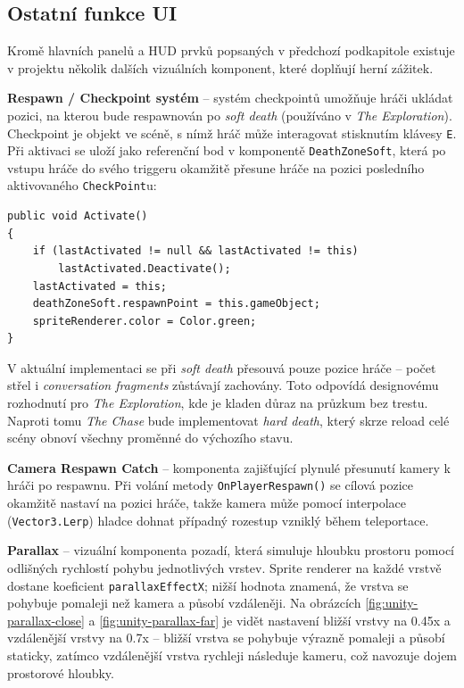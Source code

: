 \subsection{Ostatní funkce UI}
\label{sec:ostatni-funkce-ui}

Kromě hlavních panelů a HUD prvků popsaných v předchozí podkapitole existuje v projektu několik dalších vizuálních komponent, které doplňují herní zážitek.

\textbf{Respawn / Checkpoint systém} -- systém checkpointů umožňuje hráči ukládat pozici, na kterou bude respawnován po \emph{soft death} (používáno v \emph{The Exploration}). Checkpoint je objekt ve scéně, s nímž hráč může interagovat stisknutím klávesy \texttt{E}. Při aktivaci se uloží jako referenční bod v komponentě \texttt{DeathZoneSoft}, která po vstupu hráče do svého triggeru okamžitě přesune hráče na pozici posledního aktivovaného \texttt{CheckPoint}u:

\begin{lstlisting}[caption={CheckPoint -- aktivace checkpointu}, label={lst:checkpoint}]
public void Activate()
{
    if (lastActivated != null && lastActivated != this)
        lastActivated.Deactivate();
    lastActivated = this;
    deathZoneSoft.respawnPoint = this.gameObject;
    spriteRenderer.color = Color.green;
}
\end{lstlisting}

V aktuální implementaci se při \emph{soft death} přesouvá pouze pozice hráče -- počet střel i \emph{conversation fragments} zůstávají zachovány. Toto odpovídá designovému rozhodnutí pro \emph{The Exploration}, kde je kladen důraz na průzkum bez trestu. Naproti tomu \emph{The Chase} bude implementovat \emph{hard death}, který skrze reload celé scény obnoví všechny proměnné do výchozího stavu.

\textbf{Camera Respawn Catch} -- komponenta zajišťující plynulé přesunutí kamery k hráči po respawnu. Při volání metody \texttt{OnPlayerRespawn()} se cílová pozice okamžitě nastaví na pozici hráče, takže kamera může pomocí interpolace (\texttt{Vector3.Lerp}) hladce dohnat případný rozestup vzniklý během teleportace.

\textbf{Parallax} -- vizuální komponenta pozadí, která simuluje hloubku prostoru pomocí odlišných rychlostí pohybu jednotlivých vrstev. Sprite renderer na každé vrstvě dostane koeficient \texttt{parallaxEffectX}; nižší hodnota znamená, že vrstva se pohybuje pomaleji než kamera a působí vzdáleněji. Na obrázcích \ref{fig:unity-parallax-close} a \ref{fig:unity-parallax-far} je vidět nastavení bližší vrstvy na 0.45x a vzdálenější vrstvy na 0.7x -- bližší vrstva se pohybuje výrazně pomaleji a působí staticky, zatímco vzdálenější vrstva rychleji následuje kameru, což navozuje dojem prostorové hloubky.

